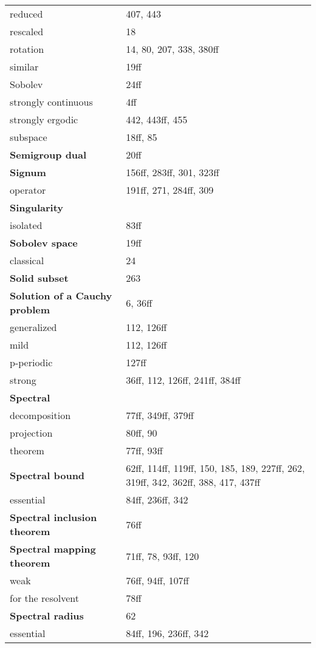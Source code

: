 \begin{longtable}{p{6cm}p{8cm}}
	\quad  reduced 	& 407, 443 \\
	\quad  rescaled 	& 18 \\
	\quad  rotation 	& 14, 80, 207, 338, 380ff \\
	\quad  similar 	& 19ff \\
	\quad  Sobolev 	& 24ff \\
	\quad  strongly continuous 	& 4ff \\
	\quad  strongly ergodic 	& 442, 443ff, 455 \\
	\quad  subspace 	& 18ff, 85 \\
\textbf{Semigroup dual} 	& 20ff \\
\textbf{Signum} 	& 156ff, 283ff, 301, 323ff \\
	\quad  operator 	& 191ff, 271, 284ff, 309 \\
\textbf{Singularity} 	& \\
	\quad  isolated 	& 83ff \\
\textbf{Sobolev space} 	& 19ff \\
	\quad  classical 	& 24 \\
\textbf{Solid subset} 	& 263 \\
\textbf{Solution of a Cauchy problem} 	& 6, 36ff \\
	\quad  generalized 	& 112, 126ff \\
	\quad  mild 	& 112, 126ff \\
	\quad  p-periodic 	& 127ff \\
	\quad  strong 	& 36ff, 112, 126ff, 241ff, 384ff \\
\textbf{Spectral} 	& \\
	\quad  decomposition 	& 77ff, 349ff, 379ff \\
	\quad  projection 	& 80ff, 90 \\
	\quad  theorem 	& 77ff, 93ff \\
\textbf{Spectral bound} 	& 62ff, 114ff, 119ff, 150, 185, 189, 227ff, 262, 319ff, 342, 362ff, 388, 417, 437ff \\
	\quad  essential 	& 84ff, 236ff, 342 \\
\textbf{Spectral inclusion theorem} 	& 76ff \\
\textbf{Spectral mapping theorem} 	& 71ff, 78, 93ff, 120 \\
	\quad  weak 	& 76ff, 94ff, 107ff \\
	\quad  for the resolvent 	& 78ff \\
\textbf{Spectral radius} 	& 62 \\
	\quad  essential 	& 84ff, 196, 236ff, 342 \\

\end{longtable}

